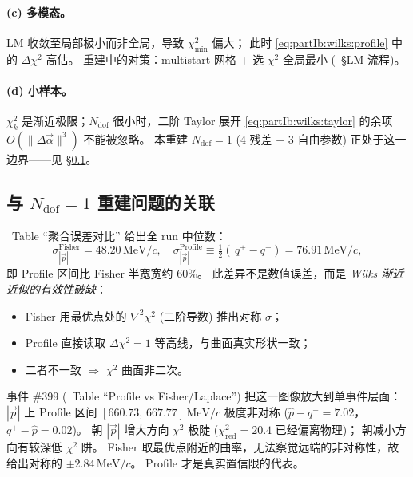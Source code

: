 \paragraph{(c) 多模态。}
LM 收敛至局部极小而非全局，导致 $\chi^2_{\min}$ 偏大；
此时 \eqref{eq:partIb:wilks:profile} 中的 $\Delta\chi^2$ 高估。
重建中的对策：multistart 网格 + 选 $\chi^2$ 全局最小 (\StatusReport\ §LM 流程)。

\paragraph{(d) 小样本。}
$\chi^2_{k}$ 是渐近极限；$N_{\mathrm{dof}}$ 很小时，二阶 Taylor 展开
\eqref{eq:partIb:wilks:taylor} 的余项 $O(\|\Delta\vec{\alpha}\|^3)$ 不能被忽略。
本重建 $N_{\mathrm{dof}} = 1$ (4 残差 $-$ 3 自由参数)
正处于这一边界——见 §\ref{sec:partIb:wilks:tie}。

\subsection{与 $N_{\mathrm{dof}}=1$ 重建问题的关联}
\label{sec:partIb:wilks:tie}

\StatusReport\ Table “聚合误差对比” 给出全 run 中位数：
\begin{equation}
  \sigma^{\mathrm{Fisher}}_{|\vec p|} = 48.20\,\mathrm{MeV}/c,
  \quad
  \sigma^{\mathrm{Profile}}_{|\vec p|}
   \!\equiv\!\tfrac12(\,q^{+}\!-q^{-})
   = 76.91\,\mathrm{MeV}/c,
  \label{eq:partIb:wilks:numbers}
\end{equation}
即 Profile 区间比 Fisher 半宽宽约 $60\%$。
此差异不是数值误差，而是 \emph{Wilks 渐近近似的有效性破缺}：

\begin{itemize}[leftmargin=2em]
  \item Fisher 用最优点处的 $\nabla^2\chi^2$ (二阶导数) 推出对称 $\sigma$；
  \item Profile 直接读取 $\Delta\chi^2 = 1$ 等高线，与曲面真实形状一致；
  \item 二者不一致 $\Rightarrow$ $\chi^2$ 曲面非二次。
\end{itemize}

事件 \#399 (\StatusReport\ Table “Profile vs Fisher/Laplace”) 把这一图像放大到单事件层面：
$|\vec p|$ 上 Profile 区间 $[660.73,\,667.77]\,\mathrm{MeV}/c$ 极度非对称
($\hat p - q^- = 7.02$，$q^+ - \hat p = 0.02$)。
朝 $|\vec p|$ 增大方向 $\chi^2$ 极陡 ($\chi^2_{\mathrm{red}}=20.4$ 已经偏离物理)；
朝减小方向有较深低 $\chi^2$ 阱。
Fisher 取最优点附近的曲率，无法察觉远端的非对称性，故给出对称的 $\pm 2.84\,\mathrm{MeV}/c$。
Profile 才是真实置信限的代表。

